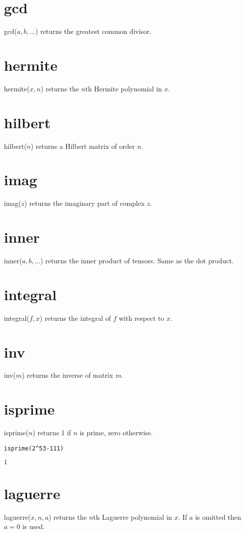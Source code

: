 \section*{gcd}
gcd($a,b,\ldots$) returns the greatest common divisor.

\section*{hermite}
hermite($x,n$) returns the $n$th Hermite polynomial in $x$.

\section*{hilbert}
hilbert($n$) returns a Hilbert matrix of order $n$.

\section*{imag}
imag($z$) returns the imaginary part of complex $z$.

\section*{inner}
inner($a,b,\ldots$) returns the inner product of tensors.
Same as the dot product.

\section*{integral}
integral($f,x$) returns the integral of $f$ with respect to $x$.

\section*{inv}
inv($m$) returns the inverse of matrix $m$.

\section*{isprime}
isprime($n$) returns 1 if $n$ is prime, zero otherwise.

\begin{Verbatim}[formatcom=\color{blue},samepage=true]
isprime(2^53-111)
\end{Verbatim}

$\displaystyle 1$

\section*{laguerre}
laguerre($x,n,a$) returns the $n$th Laguerre polynomial in $x$.
If $a$ is omitted then $a=0$ is used.

